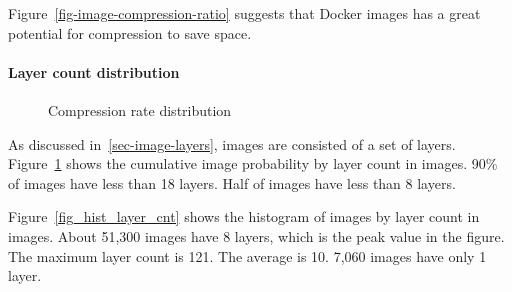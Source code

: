 Figure~\ref{fig-image-compression-ratio} suggests that Docker images has a great potential for compression to save space.

\paragraph{Layer count distribution}

\begin{figure}[!t]
	\centering
	\caption{Compression rate distribution}
	\label{fig-layer-cnt}
\end{figure}

As discussed in~\ref{sec-image-layers}, images are consisted of a set of layers. Figure~\ref{fig-layer-cnt} shows the cumulative image probability by layer count in images. 90\% of images have less than 18 layers. Half of images have less than 8 layers. 

Figure~\ref{fig_hist_layer_cnt} shows the histogram of images by layer count in images. About 51,300 images have 8 layers, which is the peak value in the figure. The maximum layer count is 121. The average is 10. 7,060 images have only 1 layer. 

